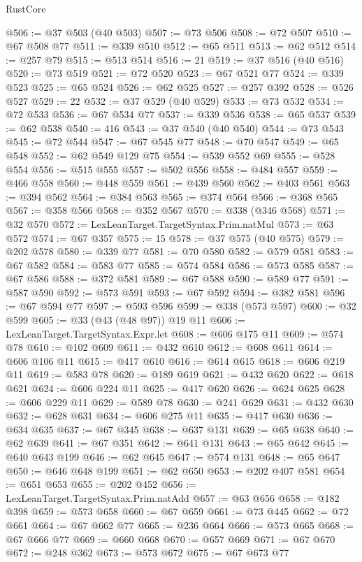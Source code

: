 \begin{lexlean}{RustCore}
\begin{coremodule}
@506 := @37 @503 (@40 @503)
@507 := @73 @506
@508 := @72 @507
@510 := @67 @508 @77
@511 := @339 @510
@512 := @65 @511
@513 := @62 @512
@514 := @257 @79
@515 := @513 @514
@516 := 21
@519 := @37 @516 (@40 @516)
@520 := @73 @519
@521 := @72 @520
@523 := @67 @521 @77
@524 := @339 @523
@525 := @65 @524
@526 := @62 @525
@527 := @257 @392
@528 := @526 @527
@529 := 22
@532 := @37 @529 (@40 @529)
@533 := @73 @532
@534 := @72 @533
@536 := @67 @534 @77
@537 := @339 @536
@538 := @65 @537
@539 := @62 @538
@540 := 416
@543 := @37 @540 (@40 @540)
@544 := @73 @543
@545 := @72 @544
@547 := @67 @545 @77
@548 := @70 @547
@549 := @65 @548
@552 := @62 @549 @129 @75
@554 := @539 @552 @69
@555 := @528 @554
@556 := @515 @555
@557 := @502 @556
@558 := @484 @557
@559 := @466 @558
@560 := @448 @559
@561 := @439 @560
@562 := @403 @561
@563 := @394 @562
@564 := @384 @563
@565 := @374 @564
@566 := @368 @565
@567 := @358 @566
@568 := @352 @567
@570 := @338 (@346 @568)
@571 := @32 @570
@572 := LexLeanTarget.TargetSyntax.Prim.natMul
@573 := @63 @572
@574 := @67 @357
@575 := 15
@578 := @37 @575 (@40 @575)
@579 := @202 @578
@580 := @339 @77
@581 := @70 @580
@582 := @579 @581
@583 := @67 @582
@584 := @583 @77
@585 := @574 @584
@586 := @573 @585
@587 := @67 @586
@588 := @372 @581
@589 := @67 @588
@590 := @589 @77
@591 := @587 @590
@592 := @573 @591
@593 := @67 @592
@594 := @382 @581
@596 := @67 @594 @77
@597 := @593 @596
@599 := @338 (@573 @597)
@600 := @32 @599
@605 := @33 (@43 (@48 @97)) @19 @11
@606 := LexLeanTarget.TargetSyntax.Expr.let
@608 := @606 @175 @11
@609 := @574 @78
@610 := @102 @609
@611 := @432 @610
@612 := @608 @611
@614 := @606 @106 @11
@615 := @417 @610
@616 := @614 @615
@618 := @606 @219 @11
@619 := @583 @78
@620 := @189 @619
@621 := @432 @620
@622 := @618 @621
@624 := @606 @224 @11
@625 := @417 @620
@626 := @624 @625
@628 := @606 @229 @11
@629 := @589 @78
@630 := @241 @629
@631 := @432 @630
@632 := @628 @631
@634 := @606 @275 @11
@635 := @417 @630
@636 := @634 @635
@637 := @67 @345
@638 := @637 @131
@639 := @65 @638
@640 := @62 @639
@641 := @67 @351
@642 := @641 @131
@643 := @65 @642
@645 := @640 @643 @199
@646 := @62 @645
@647 := @574 @131
@648 := @65 @647
@650 := @646 @648 @199
@651 := @62 @650
@653 := @202 @407 @581
@654 := @651 @653
@655 := @202 @452
@656 := LexLeanTarget.TargetSyntax.Prim.natAdd
@657 := @63 @656
@658 := @182 @398
@659 := @573 @658
@660 := @67 @659
@661 := @73 @445
@662 := @72 @661
@664 := @67 @662 @77
@665 := @236 @664
@666 := @573 @665
@668 := @67 @666 @77
@669 := @660 @668
@670 := @657 @669
@671 := @67 @670
@672 := @248 @362
@673 := @573 @672
@675 := @67 @673 @77

\end{coremodule}
\end{lexlean}
